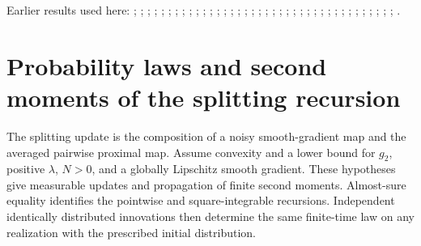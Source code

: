 \documentclass[11pt,a4paper]{report}
\begin{document}
Earlier results used here: \cite[Section~3.13.2]{LangevinLean2026ULASC}; \cite[Section~3.13.3]{LangevinLean2026ULASC}; \cite[Section~3.17.1]{LangevinLean2026ULASC}; \cite[Section~3.17.12]{LangevinLean2026ULASC}; \cite[Section~3.17.2]{LangevinLean2026ULASC}; \cite[Section~3.17.3]{LangevinLean2026ULASC}; \cite[Section~3.17.4]{LangevinLean2026ULASC}; \cite[Section~3.22.17]{LangevinLean2026ULASC}; \cite[Section~3.22.19]{LangevinLean2026ULASC}; \cite[Section~3.22.2]{LangevinLean2026ULASC}; \cite[Section~3.22.20]{LangevinLean2026ULASC}; \cite[Section~3.22.21]{LangevinLean2026ULASC}; \cite[Section~3.22.22]{LangevinLean2026ULASC}; \cite[Section~3.22.23]{LangevinLean2026ULASC}; \cite[Section~3.22.3]{LangevinLean2026ULASC}; \cite[Section~3.22.7]{LangevinLean2026ULASC}; \cite[Section~3.22.8]{LangevinLean2026ULASC}; \cite[Section~3.25.1]{LangevinLean2026ULASC}; \cite[Section~3.25.4]{LangevinLean2026ULASC}; \cite[Section~3.25.6]{LangevinLean2026ULASC}; \cite[Section~3.26.3]{LangevinLean2026ULASC}; \cite[Section~3.29.7]{LangevinLean2026ULASC}; \cite[Section~3.29.8]{LangevinLean2026ULASC}; \cite[Section~3.32.12]{LangevinLean2026ULASC}; \cite[Section~3.32.13]{LangevinLean2026ULASC}; \cite[Section~3.32.15]{LangevinLean2026ULASC}; \cite[Section~3.32.16]{LangevinLean2026ULASC}; \cite[Section~3.32.17]{LangevinLean2026ULASC}; \cite[Section~3.32.19]{LangevinLean2026ULASC}; \cite[Section~3.33.5]{LangevinLean2026ULASC}; \cite[Section~3.42.6]{LangevinLean2026ULASC}; \cite[Section~3.42.7]{LangevinLean2026ULASC}; \cite[Section~3.8.11]{LangevinLean2026ULASC}; \cite[Section~3.8.16]{LangevinLean2026ULASC}; \cite[Section~3.8.17]{LangevinLean2026ULASC}; \cite[Section~3.8.19]{LangevinLean2026ULASC}; \cite[Section~3.8.20]{LangevinLean2026ULASC}; \cite[Section~3.8.21]{LangevinLean2026ULASC}; \cite[Section~3.8.22]{LangevinLean2026ULASC}.
\section{\texorpdfstring{Probability laws and second moments of the splitting recursion}{Probability laws and second moments of the splitting recursion}}
\label{proof-module-ProximalLangevin-SplittingLaw-lean}


The splitting update is the composition of a noisy smooth-gradient map and the averaged pairwise proximal map. Assume convexity and a lower bound for \(g_2\), positive \(\lambda\), \(N>0\), and a globally Lipschitz smooth gradient. These hypotheses give measurable updates and propagation of finite second moments. Almost-sure equality identifies the pointwise and square-integrable recursions. Independent identically distributed innovations then determine the same finite-time law on any realization with the prescribed initial distribution.
\end{document}

